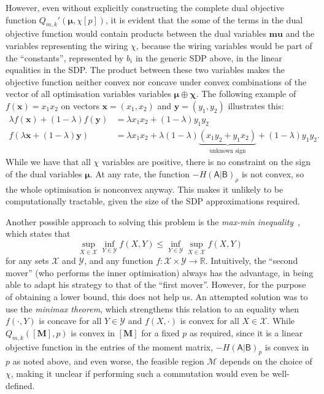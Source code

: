 \documentclass[10pt, a4paper]{article}
\numberwithin{equation}{section} %
\theoremstyle{definition}
\theoremstyle{plain}
\newcommand{\?}{\mathrel{?}} %
\newcommand{\R}{\mathbb{R}} %
\newcommand{\cvec}[1]{\boldsymbol{\mathbf{#1}}}    %
\newcommand{\matr}[2][]{\left[\mathbf{#2}#1\right]} %
\newcommand{\sM}{\mathcal{M}}
\newcommand{\sX}{\mathcal{X}}
\newcommand{\sY}{\mathcal{Y}}
\newcommand{\crv}[1]{\mathsf{#1}}
\begin{document}
                    However, even without explicitly constructing the complete dual objective function \(Q_{m,k}'(\cvec{\mu},\chi[p])\), it is evident that the some of the terms in the dual objective function would contain products between the dual variables \(\cvec{mu}\) and the variables representing the wiring \(\chi\), because the wiring variables would be part of the ``constants'', represented by \(b_i\) in the generic SDP above, in the linear equalities in the SDP\@. The product between these two variables makes the objective function neither convex nor concave under convex combinations of the vector of all optimisation variables variables \(\cvec{\mu} \oplus \cvec{\chi}\). The following example of \(f(\cvec{x}) = x_1x_2\) on vectors \(\cvec{x} = (x_1, x_2)\) and \(\cvec{y} = (y_1, y_2)\) illustrates this:
                    \begin{align}
                      \lambda f(\cvec{x}) + (1-\lambda)f(\cvec{y}) &= \lambda{x_1x_2} + (1-\lambda){y_1y_2} \\
                      f(\lambda\cvec{x} + (1-\lambda)\cvec{y}) &= \lambda{x_1x_2} + \lambda(1-\lambda)\underbrace{(x_1y_2 + y_1x_2)}_{\text{unknown sign}} + (1-\lambda){y_1y_2}.
                    \end{align}
                  While we have that all \(\chi\) variables are positive, there is no constraint on the sign of the dual variables \(\cvec{\mu}\). At any rate, the function \(-H{(\crv{A}|\crv{B})}_{\rho}\) is not convex, so the whole optimisation is nonconvex anyway. This makes it unlikely to be computationally tractable, given the size of the SDP approximations required.

                  Another possible approach to solving this problem is the \emph{max-min inequality}~\cite[Sec. 5.4]{BoydVand}, which states that 
                  \begin{equation}
                    \sup_{X\in\sX} \inf_{Y\in\sY} f(X,Y) \leq \inf_{Y\in\sY} \sup_{X\in\sX} f(X,Y)
                  \end{equation}
                  for any sets \(\sX\) and \(\sY\), and any function \(f : \sX\times\sY \to \R\). Intuitively, the ``second mover'' (who performs the inner optimisation) always has the advantage, in being able to adapt his strategy to that of the ``first mover''. However, for the purpose of obtaining a lower bound, this does not help us. An attempted solution was to use the \emph{minimax theorem}, which strengthens this relation to an equality when \(f(\cdot,Y)\) is concave for all \(Y\in\sY\) and \(f(X,\cdot)\) is convex for all \(X\in\sX\). While \(Q_{m,k}(\matr{M}, p)\) is convex in \(\matr{M}\) for a fixed \(p\) as required, since it is a linear objective function in the entries of the moment matrix, \(-H{(\crv{A}|\crv{B})}_p\) is convex in \(p\) as noted above, and even worse, the feasible region \(\sM\) depends on the choice of \(\chi\), making it unclear if performing such a commutation would even be well-defined.
\end{document}
